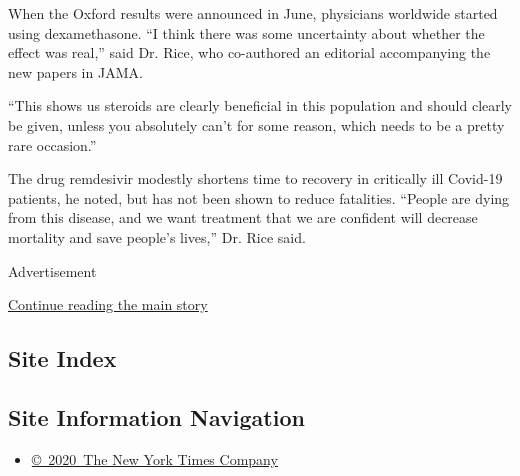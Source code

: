 When the Oxford results were announced in June, physicians worldwide
started using dexamethasone. ``I think there was some uncertainty about
whether the effect was real,'' said Dr. Rice, who co-authored an
editorial accompanying the new papers in JAMA.

``This shows us steroids are clearly beneficial in this population and
should clearly be given, unless you absolutely can't for some reason,
which needs to be a pretty rare occasion.''

The drug remdesivir modestly shortens time to recovery in critically ill
Covid-19 patients, he noted, but has not been shown to reduce
fatalities. ``People are dying from this disease, and we want treatment
that we are confident will decrease mortality and save people's lives,''
Dr. Rice said.

Advertisement

\protect\hyperlink{after-bottom}{Continue reading the main story}

\hypertarget{site-index}{%
\subsection{Site Index}\label{site-index}}

\hypertarget{site-information-navigation}{%
\subsection{Site Information
Navigation}\label{site-information-navigation}}

\begin{itemize}
\tightlist
\item
  \href{https://help.nytimes3xbfgragh.onion/hc/en-us/articles/115014792127-Copyright-notice}{©~2020~The
  New York Times Company}
\end{itemize}

